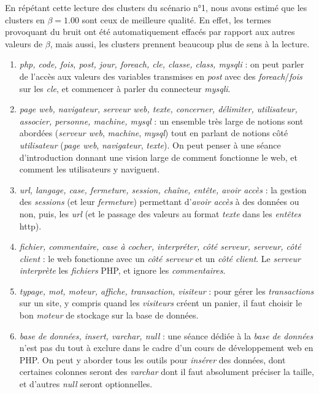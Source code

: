 \bigskip

En répétant cette lecture des clusters du scénario n°1, nous avons estimé que les clusters en $ \beta = 1.00 $ sont ceux de meilleure qualité.
En effet, les termes provoquant du bruit ont été automatiquement effacés par rapport aux autres valeurs de $ \beta $, mais aussi, les clusters prennent beaucoup plus de sens à la lecture.
\begin{enumerate}
\item \textit{php, code, fois, post, jour, foreach, cle, classe, class, mysqli} : on peut parler de l'accès aux valeurs des variables transmises en \textit{post} avec des \textit{foreach}/\textit{fois} sur les \textit{cle}, et commencer à parler du connecteur \textit{mysqli}.

\item \textit{page web, navigateur, serveur web, texte, concerner, délimiter, utilisateur, associer, personne, machine, mysql}  : un ensemble très large de notions sont abordées (\textit{serveur web}, \textit{machine}, \textit{mysql}) tout en parlant de notions côté \textit{utilisateur} (\textit{page web}, \textit{navigateur}, \textit{texte}). On peut penser à une séance d'introduction donnant une vision large de comment fonctionne le web, et comment les utilisateurs y naviguent.

\item \textit{url, langage, case, fermeture, session, chaîne, entête, avoir accès} : la gestion des \textit{sessions} (et leur  \textit{fermeture}) permettant d'\textit{avoir accès} à des données ou non, puis, les \textit{url} (et le passage des valeurs au format \textit{texte} dans les \textit{entêtes} http).

\item \textit{fichier, commentaire, case à cocher, interpréter, côté serveur, serveur, côté client} : le web fonctionne avec un \textit{côté serveur} et un \textit{côté client}. Le \textit{serveur} \textit{interprète} les \textit{fichiers} PHP, et ignore les \textit{commentaires}.

\item \textit{typage, mot, moteur, affiche, transaction, visiteur} : pour gérer les \textit{transactions} sur un site, y compris quand les \textit{visiteurs} créent un panier, il faut choisir le bon \textit{moteur} de stockage sur la base de données.

\item \textit{base de données, insert, varchar, null} : une séance dédiée à la \textit{base de données} n'est pas du tout à exclure dans le cadre d'un cours de développement web en PHP. On peut y aborder tous les outils pour \textit{insérer} des données, dont certaines colonnes seront des \textit{varchar} dont il faut absolument préciser la taille, et d'autres \textit{null} seront optionnelles.


\end{enumerate}
